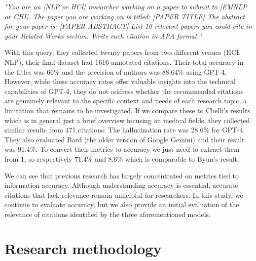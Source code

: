 \documentclass[runningheads]{llncs}
\begin{document}
\textit{"You are an [NLP or HCI] researcher working on a paper to submit to [EMNLP or CHI]. 
The paper you are working on is titled: [PAPER TITLE] The abstract for your paper is: [PAPER ABSTRACT]
List 10 relevant papers you could cite in your Related Works section. Write each citation in APA format."}

With this query, they collected twenty papers from two different venues (HCI, NLP), their final dataset had 1616 annotated citations. Their total accuracy in the titles was 66\% and the precision of authors was 88.64\% using GPT-4. However, while these accuracy rates offer valuable insights into the technical capabilities of GPT-4, they do not address whether the recommended citations are genuinely relevant to the specific context and needs of each research topic, a limitation that remains to be investigated. If we compare these to Chelli's results which is in general just a brief overview focusing on medical fields, they collected similar results from 471 citations: The hallucination rate was 28.6\% for GPT-4. They also evaluated Bard (the older version of Google Gemini) and their result was 91.4\%. To convert their metrics to accuracy we just need to extract them from 1, so respectively 71.4\% and 8.6\% which is comparable to Byun's result.

We can see that previous research has largely concentrated on metrics tied to information accuracy. Although understanding accuracy is essential, accurate citations that lack relevance remain unhelpful for researchers. In this study, we continue to evaluate accuracy, but we also provide an initial evaluation of the relevance of citations identified by the three aforementioned models.

\section{Research methodology}

\end{document}
